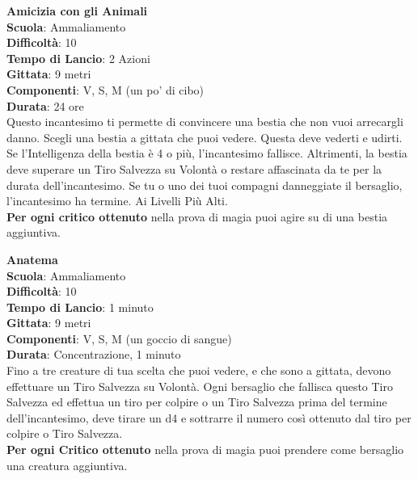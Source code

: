 \begin{multicols}{2}
\medskip\textbf{Amicizia con gli Animali}\\
\textbf{Scuola}: Ammaliamento\\
\textbf{Difficoltà}:  10\\
\textbf{Tempo di Lancio}: 2 Azioni\\
\textbf{Gittata}: 9 metri\\
\textbf{Componenti}: V, S, M (un po’ di cibo)\\
\textbf{Durata}: 24 ore\\
Questo incantesimo ti permette di convincere una bestia che non vuoi arrecargli danno. Scegli una bestia a gittata che puoi vedere. Questa deve vederti e udirti. Se l’Intelligenza della bestia è 4 o più, l'incantesimo fallisce. Altrimenti, la bestia deve superare un Tiro Salvezza su Volontà o restare affascinata da te per la durata dell'incantesimo. Se tu o uno dei tuoi compagni danneggiate il bersaglio, l'incantesimo ha termine. Ai Livelli Più Alti.\\
\textbf{Per ogni critico ottenuto} nella prova di magia puoi agire su di una bestia aggiuntiva. 

\medskip\textbf{Anatema}\\
\textbf{Scuola}: Ammaliamento\\
\textbf{Difficoltà}:  10\\
\textbf{Tempo di Lancio}: 1 minuto\\
\textbf{Gittata}: 9 metri\\
\textbf{Componenti}: V, S, M (un goccio di sangue)\\
\textbf{Durata}: Concentrazione, 1 minuto\\
Fino a tre creature di tua scelta che puoi vedere, e che sono a gittata, devono effettuare un Tiro Salvezza su Volontà. Ogni bersaglio che fallisca questo Tiro Salvezza ed effettua un tiro per colpire o un Tiro Salvezza prima del termine dell'incantesimo, deve tirare un d4 e sottrarre il numero così ottenuto dal tiro per colpire o Tiro Salvezza.\\
\textbf{Per ogni Critico ottenuto} nella prova di magia puoi prendere come bersaglio una creatura aggiuntiva.


\end{multicols}
